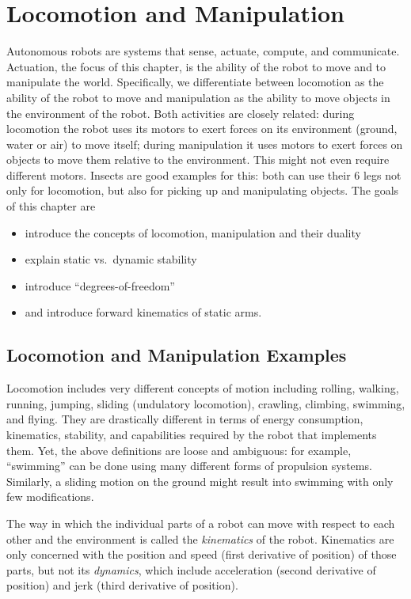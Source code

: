 \chapter{Locomotion and Manipulation}\label{chap:locomotion}
Autonomous robots are systems that sense, actuate, compute, and communicate. Actuation, the focus of this chapter, is the ability of the robot to move and to manipulate the world. Specifically, we differentiate between locomotion as the ability of the robot to move and manipulation as the ability to move objects in the environment of the robot. Both activities are closely related: during locomotion the robot uses its motors to exert forces on its environment (ground, water or air) to move itself; during manipulation it uses motors to exert forces on objects to move them relative to the environment. This might not even require different motors. Insects are good examples for this: both can use their 6 legs not only for locomotion, but also for picking up and manipulating objects. The goals of this chapter are
\begin{itemize}
\item introduce the concepts of locomotion, manipulation and their duality
\item explain static vs.\ dynamic stability
\item introduce ``degrees-of-freedom''
\item and introduce forward kinematics of static arms.
\end{itemize}

\section{Locomotion and Manipulation Examples}

Locomotion includes very different concepts of motion including rolling, walking, running, jumping, sliding (undulatory locomotion), crawling, climbing, swimming, and flying. They are drastically different in terms of energy consumption, kinematics, stability, and capabilities required by the robot that implements them. Yet, the above definitions are loose and ambiguous: for example, ``swimming'' can be done using many different forms of propulsion systems. Similarly, a sliding motion on the ground might result into swimming with only few modifications.

The way in which the individual parts of a robot can move with respect to each other and the environment is called the \emph{kinematics} of the robot. Kinematics are only concerned with the position and speed (first derivative of position) of those parts, but not its \emph{dynamics}, which include acceleration (second derivative of position) and jerk (third derivative of position).

